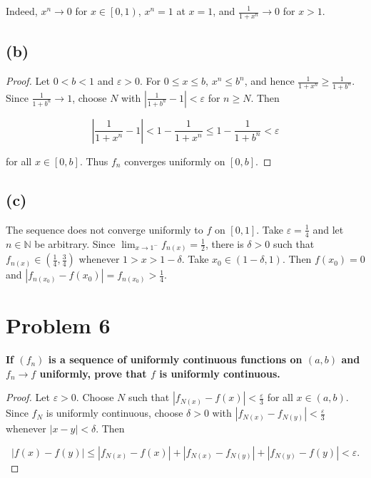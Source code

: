 Indeed, \(x^{n}\rightarrow 0\) for \(x \in \left\lbrack {0,1} \right)\), \(x^{n} = 1\) at \(x = 1\), and \(\frac{1}{1 + x^{n}}\rightarrow 0\) for \(x > 1\).

\subsection{(b)}

\begin{proof}

Let \(0 < b < 1\) and \(\varepsilon > 0\). For \(0 \leq x \leq b\), \(x^{n} \leq b^{n}\), and hence \(\frac{1}{1 + x^{n}} \geq \frac{1}{1 + b^{n}}\). Since \(\frac{1}{1 + b^{n}}\rightarrow 1\), choose \(N\) with \(\left| {\frac{1}{1 + b^{n}} - 1} \right| < \varepsilon\) for \(n \geq N\). Then

\[\left| {\frac{1}{1 + x^{n}} - 1} \right| < 1 - \frac{1}{1 + x^{n}} \leq 1 - \frac{1}{1 + b^{n}} < \varepsilon\]

for all \(x \in \left\lbrack {0,b} \right\rbrack\). Thus \(f_{n}\) converges uniformly on \(\left\lbrack {0,b} \right\rbrack\).

\end{proof}

\subsection{(c)}

The sequence does not converge uniformly to \(f\) on \(\left\lbrack {0,1} \right\rbrack\). Take \(\varepsilon = \frac{1}{4}\) and let \(n \in \mathbb{N}\) be arbitrary. Since \(\lim_{x\rightarrow 1^{-}}f_{n{(x)}} = \frac{1}{2}\), there is \(\delta > 0\) such that \(f_{n{(x)}} \in \left( {\frac{1}{4},\frac{3}{4}} \right)\) whenever \(1 > x > 1 - \delta\). Take \(x_{0} \in \left( {1 - \delta,1} \right)\). Then \(f\left( x_{0} \right) = 0\) and \(\left| {f_{n{(x_{0})}} - f\left( x_{0} \right)} \right| = f_{n{(x_{0})}} > \frac{1}{4}\).

\section{Problem 6}

\textbf{If \(\left( f_{n} \right)\) is a sequence of uniformly continuous functions on \(\left( {a,b} \right)\) and \(f_{n}\rightarrow f\) uniformly, prove that \(f\) is uniformly continuous.}

\begin{proof}

Let \(\varepsilon > 0\). Choose \(N\) such that \(\left| {f_{N{(x)}} - f(x)} \right| < \frac{\varepsilon}{3}\) for all \(x \in \left( {a,b} \right)\). Since \(f_{N}\) is uniformly continuous, choose \(\delta > 0\) with \(\left| {f_{N{(x)}} - f_{N{(y)}}} \right| < \frac{\varepsilon}{3}\) whenever \(\left| {x - y} \right| < \delta\). Then

\[\left| {f(x) - f(y)} \right| \leq \left| {f_{N{(x)}} - f(x)} \right| + \left| {f_{N{(x)}} - f_{N{(y)}}} \right| + \left| {f_{N{(y)}} - f(y)} \right| < \varepsilon.\]

\end{proof}

